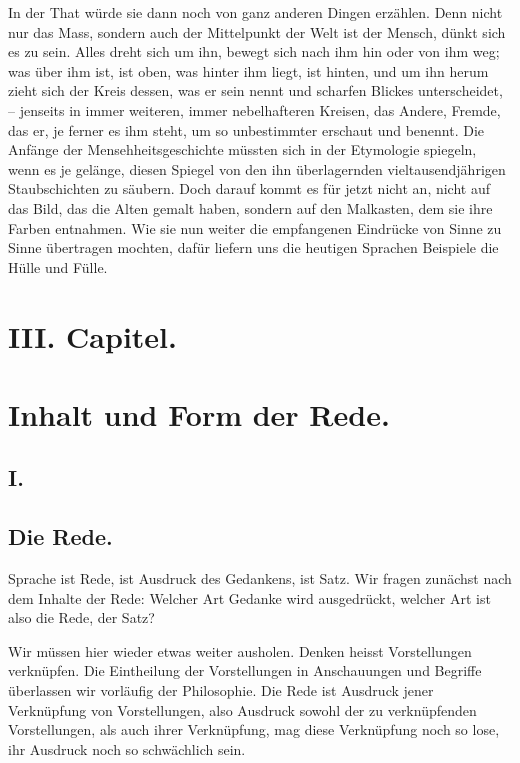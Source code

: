 In der That würde sie dann noch von ganz anderen Dingen erzählen. Denn nicht nur das Mass, sondern auch der Mittelpunkt der Welt ist der Mensch, dünkt sich es zu sein. Alles dreht sich um ihn, bewegt sich nach ihm hin oder von ihm weg; was über ihm ist, ist oben, was hinter ihm liegt, ist hinten, und um ihn herum zieht sich der Kreis dessen, was er sein nennt und scharfen Blickes unterscheidet, – jenseits in immer weiteren, immer nebelhafteren Kreisen, das Andere, Fremde, das er, je ferner es ihm steht, um so unbestimmter erschaut und benennt. Die Anfänge der Mensehheitsgeschichte müssten sich in der Etymologie spiegeln, wenn es je gelänge, diesen Spiegel von den ihn überlagernden vieltausendjährigen Staubschichten zu säubern. Doch darauf kommt es für jetzt nicht an, nicht auf das Bild, das die Alten gemalt haben, sondern auf den Malkasten, dem sie ihre Farben entnahmen. Wie sie nun weiter die empfangenen Eindrücke von Sinne zu Sinne übertragen mochten, dafür liefern uns die heutigen Sprachen Beispiele die Hülle und Fülle.

\label{fp.308}

\section*{III. Capitel.}\label{IV.III}
\section*{Inhalt und Form der Rede.}
\subsection*{I.}\label{IV.III.I}
\subsection*{Die Rede.}
Sprache ist Rede, ist Ausdruck des Gedankens, ist Satz. Wir fragen zunächst nach dem Inhalte der Rede: Welcher Art Gedanke wird ausgedrückt, welcher Art ist also die Rede, der Satz?

Wir müssen hier wieder etwas weiter ausholen. Denken heisst Vorstellungen verknüpfen. Die Eintheilung der Vorstellungen in Anschauungen und Begriffe überlassen wir vorläufig der Philosophie. Die Rede ist Ausdruck jener Verknüpfung von Vorstellungen, also Ausdruck sowohl der zu verknüpfenden Vorstellungen, als auch ihrer Verknüpfung, mag diese Verknüpfung noch so lose, ihr Ausdruck noch so schwächlich sein.

